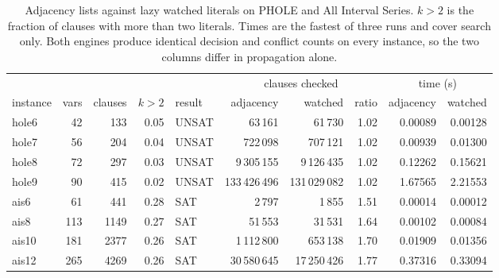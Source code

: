 \begin{table}[H]
\centering
\small
\setlength{\tabcolsep}{4pt}
\begin{tabular}{lrrrlrrrrr}
\toprule
& & & & & \multicolumn{3}{c}{clauses checked} & \multicolumn{2}{c}{time (s)} \\
\cmidrule(lr){6-8}\cmidrule(lr){9-10}
instance & vars & clauses & $k>2$ & result & adjacency & watched & ratio & adjacency & watched \\
\midrule
hole6 & 42 & 133 & 0.05 & UNSAT & 63\,161 & 61\,730 & 1.02 & 0.00089 & 0.00128 \\
hole7 & 56 & 204 & 0.04 & UNSAT & 722\,098 & 707\,121 & 1.02 & 0.00939 & 0.01300 \\
hole8 & 72 & 297 & 0.03 & UNSAT & 9\,305\,155 & 9\,126\,435 & 1.02 & 0.12262 & 0.15621 \\
hole9 & 90 & 415 & 0.02 & UNSAT & 133\,426\,496 & 131\,029\,082 & 1.02 & 1.67565 & 2.21553 \\
ais6 & 61 & 441 & 0.28 & SAT & 2\,797 & 1\,855 & 1.51 & 0.00014 & 0.00012 \\
ais8 & 113 & 1149 & 0.27 & SAT & 51\,553 & 31\,531 & 1.64 & 0.00102 & 0.00084 \\
ais10 & 181 & 2377 & 0.26 & SAT & 1\,112\,800 & 653\,138 & 1.70 & 0.01909 & 0.01356 \\
ais12 & 265 & 4269 & 0.26 & SAT & 30\,580\,645 & 17\,250\,426 & 1.77 & 0.37316 & 0.33094 \\
\bottomrule
\end{tabular}
\caption{Adjacency lists against lazy watched literals on PHOLE and All Interval Series. $k>2$ is the fraction of clauses with more than two literals. Times are the fastest of three runs and cover search only. Both engines produce identical decision and conflict counts on every instance, so the two columns differ in propagation alone.}
\label{tab:comparison}
\end{table}
